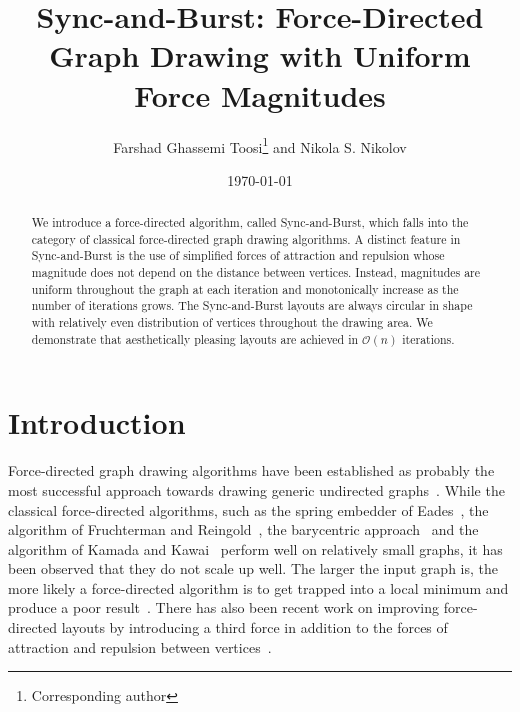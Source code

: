 \documentclass{llncs}
\begin{document}
\title{Sync-and-Burst: Force-Directed Graph Drawing with Uniform Force Magnitudes}

\author{Farshad Ghassemi Toosi\thanks{Corresponding author} and Nikola S. Nikolov}

\date{\today}

\maketitle

\begin{abstract}
We introduce a force-directed algorithm, called Sync-and-Burst, which falls into the category of classical force-directed graph drawing algorithms. A distinct feature in Sync-and-Burst is the use of simplified forces of attraction and repulsion whose magnitude does not depend on the distance between vertices. Instead, magnitudes are uniform throughout the graph at each iteration and monotonically increase as the number of iterations grows. The Sync-and-Burst layouts are always circular in shape with relatively even distribution of vertices throughout the drawing area. We demonstrate that aesthetically pleasing layouts are achieved in $\mathcal{O}(n)$ iterations.
\end{abstract}

\section{Introduction}\label{sec:introduction}

Force-directed graph drawing algorithms have been established as probably the most successful approach towards drawing generic undirected graphs~\cite{Eades2010}. While the classical force-directed algorithms, such as the spring embedder of Eades~\cite{Eades1984}, the algorithm of Fruchterman and Reingold~\cite{FruRei1991}, the barycentric approach~\cite{Tutte1963,DETT1999} and the algorithm of Kamada and Kawai~\cite{KamKaw1989} perform well on relatively small graphs, it has been observed that they do not scale up well. The larger the input graph is, the more likely a force-directed algorithm is to get trapped into a local minimum and produce a poor result~\cite{Kobourov2013}. There has also been recent work on improving force-directed layouts by introducing a third force in addition to the forces of attraction and repulsion between vertices~\cite{BanEppGooTro2013}.
\end{document}
